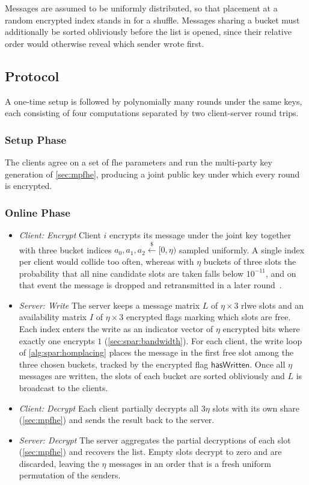 Messages are assumed to be uniformly distributed, so that placement at a random encrypted index stands in for a shuffle. Messages sharing a bucket must additionally be sorted obliviously before the list is opened, since their relative order would otherwise reveal which sender wrote first.

\subsection{Protocol}
\label{sec:spar:protocol}
A one-time setup is followed by polynomially many rounds under the same keys, each consisting of four computations separated by two client-server round trips.

\subsubsection{Setup Phase}
The clients agree on a set of \gls{fhe} parameters and run the multi-party key generation of \autoref{sec:mpfhe}, producing a joint public key under which every round is encrypted.

\subsubsection{Online Phase}
\begin{itemize}
    \item \emph{Client: Encrypt} Client $i$ encrypts its message under the joint key together with three bucket indices $a_0, a_1, a_2 \overset{\$}{\leftarrow} [0, \eta)$ sampled uniformly. A single index per client would collide too often, whereas with $\eta$ buckets of three slots the probability that all nine candidate slots are taken falls below $10^{-11}$, and on that event the message is dropped and retransmitted in a later round~\cite{cryptoeprint:2025/860}.
    \item \emph{Server: Write} The server keeps a message matrix $L$ of $\eta\times3$ \gls{rlwe} slots and an availability matrix $I$ of $\eta\times3$ encrypted flags marking which slots are free. Each index enters the write as an indicator vector of $\eta$ encrypted bits where exactly one encrypts $1$ (\autoref{sec:spar:bandwidth}). For each client, the write loop of \autoref{alg:spar:homplacing} places the message in the first free slot among the three chosen buckets, tracked by the encrypted flag $\mathsf{hasWritten}$. Once all $\eta$ messages are written, the slots of each bucket are sorted obliviously and $L$ is broadcast to the clients.
    \item \emph{Client: Decrypt} Each client partially decrypts all $3\eta$ slots with its own share (\autoref{sec:mpfhe}) and sends the result back to the server.
    \item \emph{Server: Decrypt} The server aggregates the partial decryptions of each slot (\autoref{sec:mpfhe}) and recovers the list. Empty slots decrypt to zero and are discarded, leaving the $\eta$ messages in an order that is a fresh uniform permutation of the senders.
\end{itemize}

